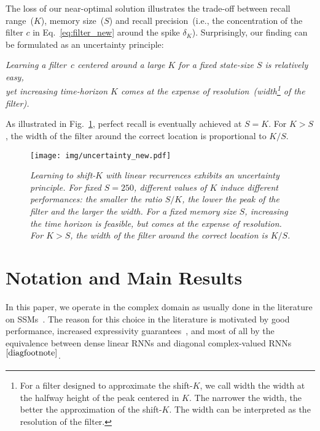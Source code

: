 The loss of our near-optimal solution illustrates the trade-off between recall range~($K$), memory size~($S$) and recall precision~(i.e., the concentration of the filter $c$ in Eq.~\eqref{eq:filter_new} around the spike $\delta_{K}$). Surprisingly, our finding can be formulated as an uncertainty principle: 
\begin{center}
\textit{Learning a filter~$c$ centered around a large $K$ for a fixed state-size $S$ is relatively easy,\\ yet increasing time-horizon $K$ comes at the expense of resolution~(width\footnote{For a filter designed to approximate the shift-$K$, we call width the width at the halfway height of the peak centered in $K$. The narrower the width, the better the approximation of the shift-$K$. The width can be interpreted as the resolution of the filter.} of the filter). }
\end{center}
As illustrated in Fig.~\ref{figure uncertainty principle}, perfect recall is eventually achieved at $S=K$. For $K>S$, the width of the filter around the correct location is proportional to $K/S$.

\begin{figure}[h]
    \centering
    \texttt{[image: img/uncertainty\_new.pdf]}

    \vspace*{-0cm}
    
    \caption{\textit{Learning to shift-$K$ with linear recurrences exhibits an uncertainty principle. For fixed $S=250$, different values of $K$ induce different performances: the smaller the ratio $S/K$, the lower the peak of the filter and the larger the width. For a fixed memory size $S$, increasing the time horizon is feasible, but comes at the expense of resolution. For $K>S$, the width of the filter around the correct location is $K/S$.}}
    \label{figure uncertainty principle}
\end{figure}


\section{Notation and Main Results}
In this paper, we operate in the complex domain as usually done in the literature on SSMs~\citep{gu2022parameterization,orvieto2023resurrecting}. The reason for this choice in the literature is motivated by good performance, increased expressivity guarantees~\citep{orvieto2024universality,ran2024provable}, and most of all by the equivalence between dense linear RNNs and diagonal complex-valued RNNs$^{\ref{diagfootnote}}$.

